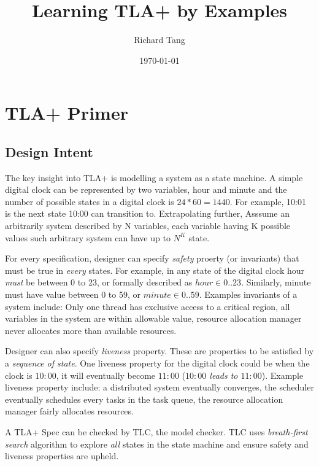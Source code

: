 \documentclass{report}
\title{Learning TLA+ by Examples}
\author{Richard Tang}
\date{\today}
\begin{document}
\maketitle
\tableofcontents



\chapter{TLA+ Primer}

\section{Design Intent}

The key insight into TLA+ is modelling a system as a state machine. A simple
digital clock can be represented by two variables, hour and minute and the
number of possible states in a digital clock is $24 * 60 = 1440$.  For example,
10:01 is the next state 10:00 can transition to. Extrapolating further, Asssume
an arbitrarily system described by N variables, each variable having K possible
values such arbitrary system can have up to $N^K$ state.\newline

For every specification, designer can specify \textit{safety} proerty (or
invariants) that must be true in \textit{every} states. For example, in any
state of the digital clock hour \textit{must} be between 0 to 23, or formally
described as $hour \in 0..23$. Similarly, minute must have value between 0 to
59, or $minute \in 0..59$. Examples invariants of a system include: Only one
thread has exclusive access to a critical region, all variables in the system
are within allowable value, resource allocation manager never allocates more
than available resources.\newline

Designer can also specify \textit{liveness} property. These are properties to be
satisfied by a \textit{sequence of state}. One liveness property for the digital
clock could be when the clock is $10:00$, it will eventually become $11:00$
(\textit{$10:00$ leads to $11:00$}). Example liveness property include: a
distributed system eventually converges, the scheduler eventually schedules
every tasks in the task queue, the resource allocation manager fairly allocates
resources. \newline

A TLA+ Spec can be checked by TLC, the model checker. TLC uses
\textit{breath-first search} algorithm to explore \textit{all} states in the
state machine and ensure safety and liveness properties are upheld.\newline
\end{document}
